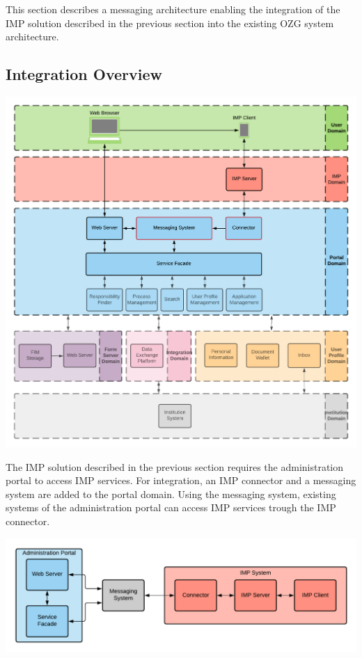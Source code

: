 This section describes a messaging architecture enabling the integration of the IMP solution described in the previous section into the existing OZG system architecture.

\subsection{Integration Overview}

\begin{center}
    \includegraphics[scale=0.6]{Diagrams/Integration Architecture 1/Technological Integration/1. Integration Overview.pdf}
\end{center}

The IMP solution described in the previous section requires the administration portal to access IMP services. For integration, an IMP connector and a messaging system are added to the portal domain. Using the messaging system, existing systems of the administration portal can access IMP services trough the IMP connector.

\begin{center}
    \includegraphics[scale=0.6]{Diagrams/Integration Architecture 1/Technological Integration/2. System Integration Overview.pdf}
\end{center}

